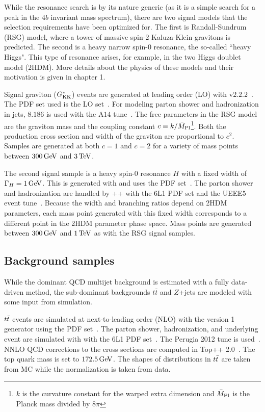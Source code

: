 While the resonance search is by its nature generic (as it is a simple search for a peak in the $4b$ invariant mass spectrum), there are two signal models that the selection requirements have been optimized for. The first is  Randall-Sundrum (RSG) model, where a tower of massive spin-$2$ Kaluza-Klein gravitons is predicted. The second is a heavy narrow spin-$0$ resonance, the so-called ``heavy Higgs". This type of resonance arises, for example, in the two Higgs doublet model (2HDM). More details about the physics of these models and their motivation is given in chapter 1. 

Signal graviton ($G^*_{\rm KK}$) events are generated at leading order (LO) with  v$2.2.2$~\cite{MG5aMCatNLO}. The PDF set used is the  LO set~\cite{nnpdf}. For modeling parton shower and hadronization in jets, \PYTHIA $8.186$ is used with the A$14$ tune~\cite{pythia8,a14tune}. The free parameters in the RSG model are the graviton mass and the coupling constant $c \equiv k/\bar{M}_{\rm Pl}$\footnote{$k$ is the curvature constant for the warped extra dimension and $\bar{M}_{\rm Pl}$ is the Planck mass divided by $8\pi$}. Both the production cross section and width of the graviton are proportional to $c^2$. Samples are generated at both $c = 1$ and $c = 2$ for a variety of mass points between $300 \GeV$ and $3 \TeV$. 

The second signal sample is a heavy spin-$0$ resonance $H$ with a fixed width of $\Gamma_H = 1 \GeV$. This is generated with  and uses the  PDF set~\cite{ct10}. The parton shower and hadronization are handled by \HERWIG++ with the \CTEQ6L1 PDF set and the UEEE5 event tune~\cite{HerwigPP,cteq,UEEE5}. Because the width and branching ratios depend on 2HDM parameters, each mass point generated with this fixed width corresponds to a different point in the 2HDM parameter phase space. Mass points are generated between $300 \GeV$ and $1 \TeV$ as with the RSG signal samples. 

\subsection{Background samples}

While the dominant QCD multijet background is estimated with a fully data-driven method, the sub-dominant backgrounds $t\bar{t}$ and $Z$+jets are modeled with some input from simulation.

$t\bar{t}$ events are simulated at next-to-leading order (NLO) with the \POWHEGBOX version 1 generator using the  PDF set~\cite{PowhegBox}. The parton shower, hadronization, and underlying event are simulated with  with the \CTEQ6L1 PDF set~\cite{pythia6}. The Perugia 2012 tune is used~\cite{Perugia2012}. NNLO QCD corrections to the cross sections are computed in Top++ 2.0~\cite{TopPP}. The top quark mass is set to $172.5 \GeV$. The shapes of distributions in $t\bar{t}$ are taken from MC while the normalization is taken from data.

